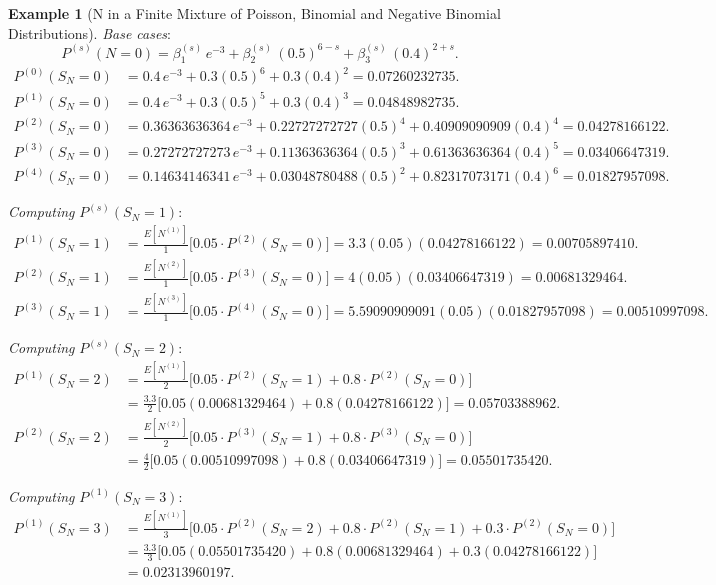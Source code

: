 \documentclass[11pt]{amsart}
\theoremstyle{definition}
\newtheorem{example}{Example}
\theoremstyle{plain}
\begin{document}
\begin{example}[N in a Finite Mixture of Poisson, Binomial and Negative Binomial
Distributions]
\noindent\textit{Base cases}:
\[
    P^{(s)}(N = 0)
    = \beta_1^{(s)}\,e^{-3} + \beta_2^{(s)}\,(0.5)^{6-s}
    + \beta_3^{(s)}\,(0.4)^{2+s}.
\]
\begin{align*}
P^{(0)}(S_N = 0)
    &= 0.4\,e^{-3} + 0.3(0.5)^6 + 0.3(0.4)^2 = 0.07260232735. \\
P^{(1)}(S_N = 0)
    &= 0.4\,e^{-3} + 0.3(0.5)^5 + 0.3(0.4)^3 = 0.04848982735. \\
P^{(2)}(S_N = 0)
    &= 0.36363636364\,e^{-3} + 0.22727272727(0.5)^4
     + 0.40909090909(0.4)^4 = 0.04278166122. \\
P^{(3)}(S_N = 0)
    &= 0.27272727273\,e^{-3} + 0.11363636364(0.5)^3
     + 0.61363636364(0.4)^5 = 0.03406647319. \\
P^{(4)}(S_N = 0)
    &= 0.14634146341\,e^{-3} + 0.03048780488(0.5)^2
     + 0.82317073171(0.4)^6 = 0.01827957098.
\end{align*}

\noindent\textit{Computing} $P^{(s)}(S_N = 1)$:
\begin{align*}
P^{(1)}(S_N = 1)
    &= \frac{E[N^{(1)}]}{1}\bigl[0.05 \cdot P^{(2)}(S_N = 0)\bigr]
     = 3.3(0.05)(0.04278166122) = 0.00705897410. \\
P^{(2)}(S_N = 1)
    &= \frac{E[N^{(2)}]}{1}\bigl[0.05 \cdot P^{(3)}(S_N = 0)\bigr]
     = 4(0.05)(0.03406647319) = 0.00681329464. \\
P^{(3)}(S_N = 1)
    &= \frac{E[N^{(3)}]}{1}\bigl[0.05 \cdot P^{(4)}(S_N = 0)\bigr]
     = 5.59090909091(0.05)(0.01827957098) = 0.00510997098.
\end{align*}

\noindent\textit{Computing} $P^{(s)}(S_N = 2)$:
\begin{align*}
P^{(1)}(S_N = 2)
    &= \frac{E[N^{(1)}]}{2}
       \bigl[0.05 \cdot P^{(2)}(S_N = 1) + 0.8 \cdot P^{(2)}(S_N = 0)\bigr] \\
    &= \frac{3.3}{2}
       \bigl[0.05(0.00681329464) + 0.8(0.04278166122)\bigr]
     = 0.05703388962. \\
P^{(2)}(S_N = 2)
    &= \frac{E[N^{(2)}]}{2}
       \bigl[0.05 \cdot P^{(3)}(S_N = 1) + 0.8 \cdot P^{(3)}(S_N = 0)\bigr] \\
    &= \frac{4}{2}
       \bigl[0.05(0.00510997098) + 0.8(0.03406647319)\bigr]
     = 0.05501735420.
\end{align*}

\noindent\textit{Computing} $P^{(1)}(S_N = 3)$:
\begin{align*}
P^{(1)}(S_N = 3)
    &= \frac{E[N^{(1)}]}{3}
       \bigl[0.05 \cdot P^{(2)}(S_N = 2) + 0.8 \cdot P^{(2)}(S_N = 1)
       + 0.3 \cdot P^{(2)}(S_N = 0)\bigr] \\
    &= \frac{3.3}{3}
       \bigl[0.05(0.05501735420) + 0.8(0.00681329464)
       + 0.3(0.04278166122)\bigr] \\
    &= 0.02313960197.
\end{align*}


\end{example}
\end{document}

